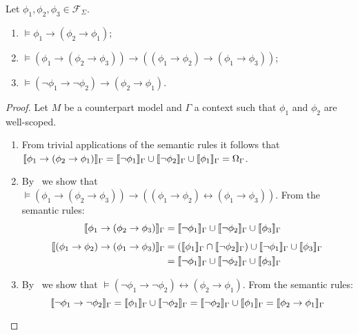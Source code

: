 \begin{lemma}\label{lem:propaxioms}
  Let $\phi_1, \phi_2, \phi_3 \in \mathcal{F}_\Sigma$.
  \begin{enumerate}
    \item $\vDash \phi_1 \to (\phi_2 \to \phi_1)$;
    \item $\vDash (\phi_1 \to (\phi_2 \to \phi_3)) \to ((\phi_1 \to \phi_2) \to (\phi_1 \to \phi_3))$;
    \item $\vDash (\neg\phi_1 \to \neg\phi_2) \to (\phi_2 \to \phi_1)$.
  \end{enumerate}
\end{lemma}
\begin{proof}
  Let $M$ be a counterpart model and $\Gamma$ a context such that $\phi_1$ and $\phi_2$ are well-scoped.
  \begin{enumerate}
    \item From trivial applications of the semantic rules it follows that $\llbracket \phi_1 \to (\phi_2 \to \phi_1) \rrbracket_{\Gamma}
      = \llbracket \neg\phi_1 \rrbracket_{\Gamma} \cup \llbracket \neg\phi_2 \rrbracket_{\Gamma} \cup \llbracket \phi_1 \rrbracket_{\Gamma} = \Omega_{\Gamma}$.

    \item By~ we show that $\vDash (\phi_1 \to (\phi_2 \to \phi_3)) \to ((\phi_1 \to \phi_2)
      \leftrightarrow (\phi_1 \to \phi_3))$. From the semantic rules:
      \[
        \begin{split}
          \llbracket \phi_1 \to (\phi_2 \to \phi_3) \rrbracket_{\Gamma} &= \llbracket \neg\phi_1 \rrbracket_{\Gamma} \cup \llbracket \neg\phi_2 \rrbracket_{\Gamma} \cup
            \llbracket \phi_3 \rrbracket_{\Gamma} \\[1ex]
          \llbracket (\phi_1 \to \phi_2) \to (\phi_1 \to \phi_3) \rrbracket_{\Gamma} &= (\llbracket \phi_1 \rrbracket_{\Gamma} \cap
            \llbracket \neg\phi_2 \rrbracket_{\Gamma}) \cup \llbracket \neg\phi_1 \rrbracket_{\Gamma} \cup \llbracket \phi_3 \rrbracket_{\Gamma} \\
          &= \llbracket \neg\phi_1 \rrbracket_{\Gamma} \cup \llbracket \neg\phi_2 \rrbracket_{\Gamma} \cup \llbracket \phi_3 \rrbracket_{\Gamma}
        \end{split}
      \]

    \item By~ we show that $\vDash (\neg\phi_1 \to \neg\phi_2) \leftrightarrow (\phi_2 \to \phi_1)$.
      From the semantic rules:
      \[
        \llbracket \neg\phi_1 \to \neg\phi_2 \rrbracket_{\Gamma} = \llbracket \phi_1 \rrbracket_{\Gamma} \cup \llbracket \neg\phi_2 \rrbracket_{\Gamma} =
        \llbracket \neg\phi_2 \rrbracket_{\Gamma} \cup \llbracket \phi_1 \rrbracket_{\Gamma} = \llbracket \phi_2 \to \phi_1 \rrbracket_{\Gamma}
      \]
  \end{enumerate}
\end{proof}

